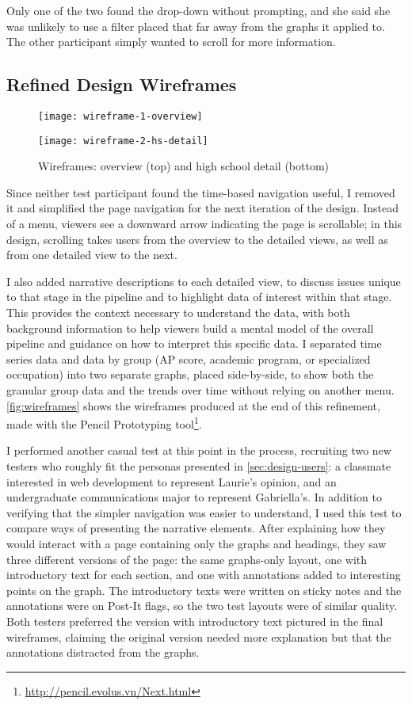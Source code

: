 Only one of the two found the drop-down without prompting, and she said she was unlikely to use a filter placed that far away from the graphs it applied to. The other participant simply wanted to scroll for more information.

\subsection{Refined Design Wireframes}\label{sec:dev-wireframes}
\begin{figure}
  \texttt{[image: wireframe-1-overview]}

  \vspace{2cm}

  \texttt{[image: wireframe-2-hs-detail]}
  \caption{Wireframes: overview (top) and high school detail (bottom)}\label{fig:wireframes}
\end{figure}

Since neither test participant found the time-based navigation useful, I removed it and simplified the page navigation for the next iteration of the design. Instead of a menu, viewers see a downward arrow indicating the page is scrollable; in this design, scrolling takes users from the overview to the detailed views, as well as from one detailed view to the next.

I also added narrative descriptions to each detailed view, to discuss issues unique to that stage in the pipeline and to highlight data of interest within that stage. This provides the context necessary to understand the data, with both background information to help viewers build a mental model of the overall pipeline and guidance on how to interpret this specific data. I separated time series data and data by group (AP score, academic program, or specialized occupation) into two separate graphs, placed side-by-side, to show both the granular group data and the trends over time without relying on another menu. \autoref{fig:wireframes} shows the wireframes produced at the end of this refinement, made with the Pencil Prototyping tool\footnote{\url{http://pencil.evolus.vn/Next.html}}.

I performed another casual test at this point in the process, recruiting two new testers who roughly fit the personas presented in \autoref{sec:design-users}: a classmate interested in web development to represent Laurie's opinion, and an undergraduate communications major to represent Gabriella's. In addition to verifying that the simpler navigation was easier to understand, I used this test to compare ways of presenting the narrative elements. After explaining how they would interact with a page containing only the graphs and headings, they saw three different versions of the page: the same graphs-only layout, one with introductory text for each section, and one with annotations added to interesting points on the graph. The introductory texts were written on sticky notes and the annotations were on Post-It flags, so the two test layouts were of similar quality. Both testers preferred the version with introductory text pictured in the final wireframes, claiming the original version needed more explanation but that the annotations distracted from the graphs.


